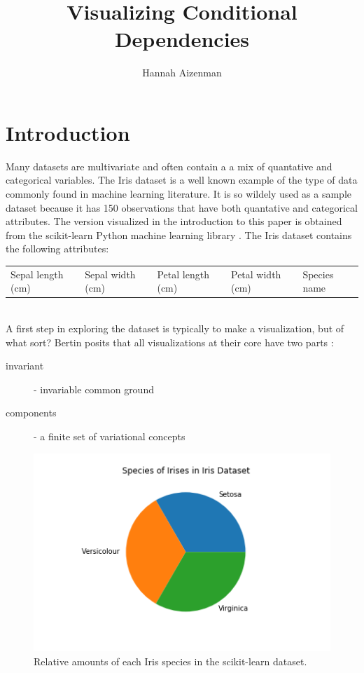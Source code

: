 \documentclass[letterpaper,onecolumn,titlepage]{Ythesis}
\title{Visualizing Conditional Dependencies}
\author{Hannah Aizenman}
\begin{document}
\makefrontmatter

\section{Introduction}
\label{sec:introduction}
Many datasets are multivariate and often contain a a mix of quantative and categorical variables. The Iris dataset \cite{fisher_use_1936-1, _uci_????} is a well known example of the type of data commonly found in machine learning literature. It is so wildely used as a sample dataset because it has 150 observations that have both quantative and categorical attributes. The version visualized in the introduction to this paper is obtained from the scikit-learn Python machine learning library \cite{scikit-learn}. The Iris dataset contains the following attributes:\\
\begin{tabular} {lllll}
Sepal length (cm) & Sepal width (cm) & Petal length (cm) & Petal width (cm) & Species name
\end{tabular}
\\
A first step in exploring the dataset is typically to make a visualization, but of what sort? Bertin posits that all visualizations at their core have two parts \cite{bertin_semiology_2011}:
\begin{description}
\item[invariant] - invariable common ground
\item[components] - a finite set of variational concepts
\end{description}

\begin{figure}
	\includegraphics[width=\textwidth]{intro/iris_pie}
  	\caption{Relative amounts of each Iris species in the scikit-learn dataset\cite{scikit-learn}.}
  	\label{fig:iris_pie}
\end{figure}
\end{document}
